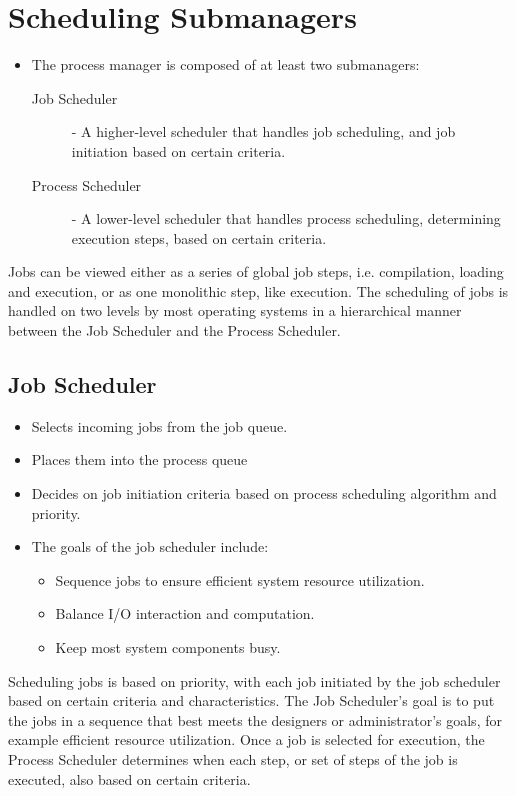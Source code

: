 \documentclass[12pt letter]{report}
\begin{document}
\section{Scheduling Submanagers}
\begin{itemize}
  \item The process manager is composed of at least two submanagers:
    \begin{description}
      \item[Job Scheduler] - A higher-level scheduler that handles
        job scheduling, and job initiation based on certain criteria.
      \item[Process Scheduler] - A lower-level scheduler that handles
        process scheduling, determining execution steps, based on
        certain criteria.
    \end{description}
\end{itemize}

Jobs can be viewed either as a series of global job steps, i.e.
compilation, loading and execution, or as one monolithic step, like
execution. The scheduling of jobs is handled on two levels by most
operating systems in a hierarchical manner between the Job Scheduler
and the Process Scheduler.

\subsection{Job Scheduler}
\begin{itemize}
  \item Selects incoming jobs from the job queue.
  \item Places them into the process queue
  \item Decides on job initiation criteria based on process
    scheduling algorithm and priority.
  \item The goals of the job scheduler include:
    \begin{itemize}
      \item Sequence jobs to ensure efficient system resource utilization.
      \item Balance I/O interaction and computation.
      \item Keep most system components busy.
    \end{itemize}
\end{itemize}

Scheduling jobs is based on priority, with each job initiated by the
job scheduler based on certain criteria and characteristics. The Job
Scheduler's goal is to put the jobs in a sequence that best meets the
designers or administrator's goals, for example efficient resource
utilization. Once a job is selected for execution, the Process
Scheduler determines when each step, or set of steps of the job is
executed, also based on certain criteria.
\end{document}
